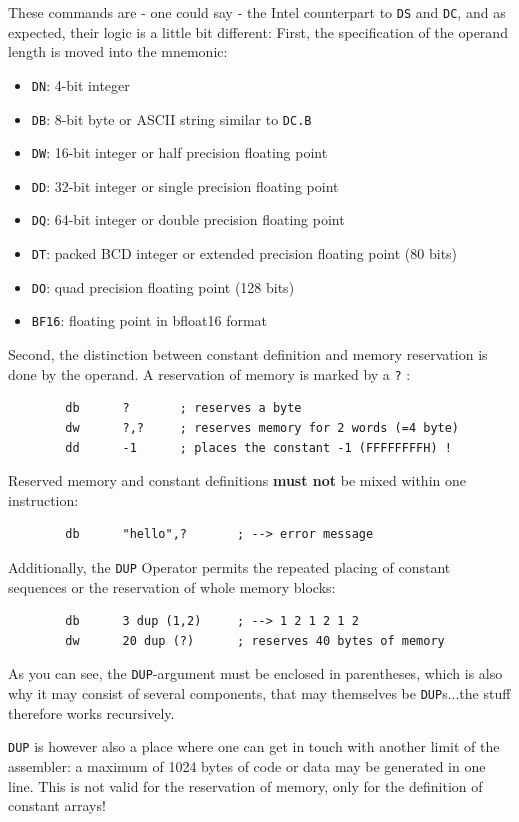 \documentclass[12pt,twoside]{report}
\newcommand{\bb}[1]{{\bf #1}}
\newcommand{\tty}[1]{{\tt #1}}
\begin{document}
These commands are - one could say - the Intel counterpart to \tty{DS} and
\tty{DC}, and as expected, their logic is a little bit different: First,
the specification of the operand length is moved into the mnemonic:
\begin{itemize}
\item{\tty{DN}: 4-bit integer}
\item{\tty{DB}: 8-bit byte or ASCII string similar to \tty{DC.B}}
\item{\tty{DW}: 16-bit integer or half precision floating point}
\item{\tty{DD}: 32-bit integer or single precision floating point}
\item{\tty{DQ}: 64-bit integer or double precision floating point}
\item{\tty{DT}: packed BCD integer or extended precision floating point (80 bits)}
\item{\tty{DO}: quad precision floating point (128 bits)}
\item{\tty{BF16}: floating point in bfloat16 format}
\end{itemize}
Second, the distinction between constant definition and memory
reservation is done by the operand.  A reservation of memory is
marked by a \tty{?} :
\begin{verbatim}
        db      ?       ; reserves a byte
        dw      ?,?     ; reserves memory for 2 words (=4 byte)
        dd      -1      ; places the constant -1 (FFFFFFFFH) !
\end{verbatim}
Reserved memory and constant definitions \bb{must not} be mixed within one
instruction:
\begin{verbatim}
        db      "hello",?       ; --> error message
\end{verbatim}
Additionally, the \tty{DUP} Operator permits the repeated placing of
constant sequences or the reservation of whole memory blocks:
\begin{verbatim}
        db      3 dup (1,2)     ; --> 1 2 1 2 1 2
        dw      20 dup (?)      ; reserves 40 bytes of memory
\end{verbatim}
As you can see, the \tty{DUP}-argument must be enclosed in parentheses,
which is also why it may consist of several components, that may
themselves be \tty{DUP}s...the stuff therefore works recursively.

\tty{DUP} is however also a place where one can get in touch with another
limit of the assembler: a maximum of 1024 bytes of code or data may be
generated in one line.  This is not valid for the reservation of memory,
only for the definition of constant arrays!
\end{document}
